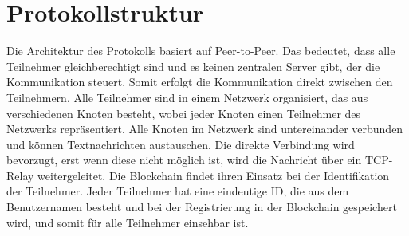 \section{Protokollstruktur}
\label{sec:protokolldesign_und_struktur}




Die Architektur des Protokolls basiert auf Peer-to-Peer. Das bedeutet, dass alle Teilnehmer gleichberechtigt sind und es keinen zentralen Server gibt, der die Kommunikation steuert. Somit erfolgt die Kommunikation direkt zwischen den Teilnehmern. Alle Teilnehmer sind in einem Netzwerk organisiert, das aus verschiedenen Knoten besteht, wobei jeder Knoten einen Teilnehmer des Netzwerks repräsentiert. Alle Knoten im Netzwerk sind untereinander verbunden und können Textnachrichten austauschen. Die direkte Verbindung wird bevorzugt, erst wenn diese nicht möglich ist, wird die Nachricht über ein TCP-Relay weitergeleitet. Die Blockchain findet ihren Einsatz bei der Identifikation der Teilnehmer. Jeder Teilnehmer hat eine eindeutige ID, die aus dem Benutzernamen besteht und bei der Registrierung in der Blockchain gespeichert wird, und somit für alle Teilnehmer einsehbar ist.









%



%

%

%




